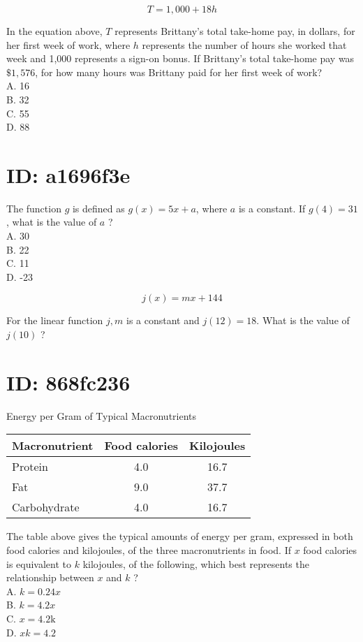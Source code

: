 $$
T=1,000+18 h
$$

In the equation above, $T$ represents Brittany's total take-home pay, in dollars, for her first week of work, where $h$ represents the number of hours she worked that week and 1,000 represents a sign-on bonus. If Brittany's total take-home pay was $\$ 1,576$, for how many hours was Brittany paid for her first week of work?\\
A. 16\\
B. 32\\
C. 55\\
D. 88

\section*{ID: a1696f3e}
The function $g$ is defined as $g(x)=5 x+a$, where $a$ is a constant. If $g(4)=31$, what is the value of $a$ ?\\
A. 30\\
B. 22\\
C. 11\\
D. -23

$$
j(x)=m x+144
$$

For the linear function $j, m$ is a constant and $j(12)=18$. What is the value of $j(10)$ ?

\section*{ID: 868fc236}
Energy per Gram of Typical Macronutrients

\begin{center}
\begin{tabular}{|l|c|c|}
\hline
Macronutrient & Food calories & Kilojoules \\
\hline
Protein & 4.0 & 16.7 \\
\hline
Fat & 9.0 & 37.7 \\
\hline
Carbohydrate & 4.0 & 16.7 \\
\hline
\end{tabular}
\end{center}

The table above gives the typical amounts of energy per gram, expressed in both food calories and kilojoules, of the three macronutrients in food. If $x$ food calories is equivalent to $k$ kilojoules, of the following, which best represents the relationship between $x$ and $k$ ?\\
A. $k=0.24 x$\\
B. $k=4.2 x$\\
C. $x=4.2 \mathrm{k}$\\
D. $x k=4.2$

